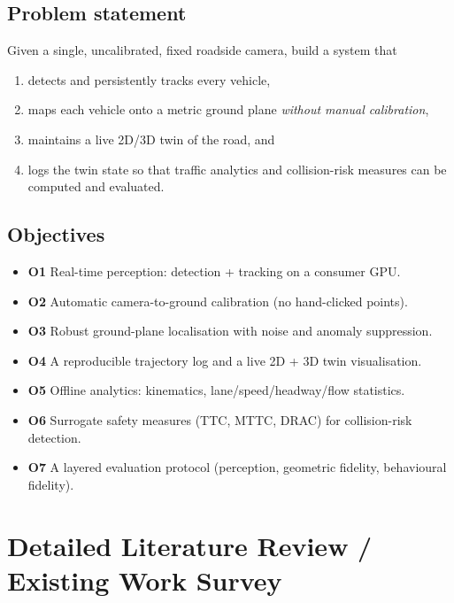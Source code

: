 \documentclass[11pt,a4paper]{article}
\begin{document}
\subsection{Problem statement}
Given a single, uncalibrated, fixed roadside camera, build a system that
\begin{enumerate}[nosep]
  \item detects and persistently tracks every vehicle,
  \item maps each vehicle onto a metric ground plane \emph{without manual calibration},
  \item maintains a live 2D/3D twin of the road, and
  \item logs the twin state so that traffic analytics and collision-risk measures can be computed and evaluated.
\end{enumerate}

\subsection{Objectives}
\begin{itemize}[nosep]
  \item \textbf{O1} Real-time perception: detection + tracking on a consumer GPU.
  \item \textbf{O2} Automatic camera-to-ground calibration (no hand-clicked points).
  \item \textbf{O3} Robust ground-plane localisation with noise and anomaly suppression.
  \item \textbf{O4} A reproducible trajectory log and a live 2D + 3D twin visualisation.
  \item \textbf{O5} Offline analytics: kinematics, lane/speed/headway/flow statistics.
  \item \textbf{O6} Surrogate safety measures (TTC, MTTC, DRAC) for collision-risk detection.
  \item \textbf{O7} A layered evaluation protocol (perception, geometric fidelity, behavioural fidelity).
\end{itemize}

\section{Detailed Literature Review / Existing Work Survey}
\end{document}
